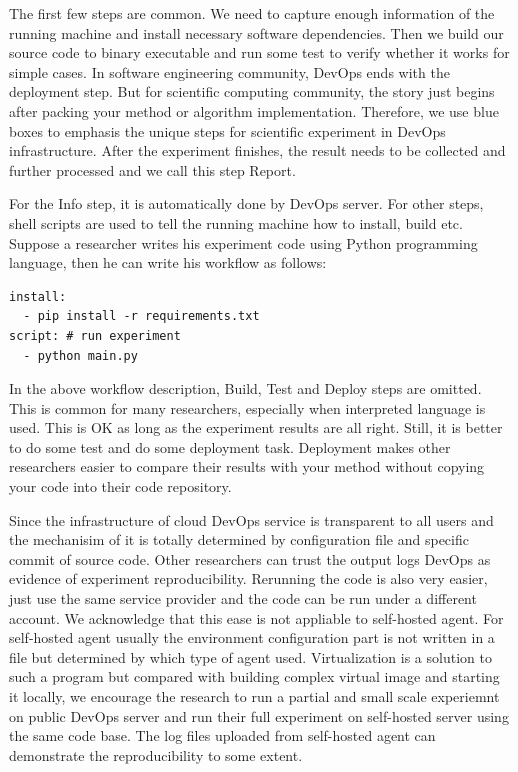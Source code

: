\documentclass{IEEEcsmag}
\begin{document}
The first few steps are common. We need to capture enough information of the running machine and install necessary software dependencies. Then we build our source code to binary executable and run some test to verify whether it works for simple cases. In software engineering community, DevOps ends with the deployment step. But for scientific computing community, the story just begins after packing your method or algorithm implementation. Therefore, we use blue boxes to emphasis the unique steps for scientific experiment in DevOps infrastructure. After the experiment finishes, the result needs to be collected and further processed and we call this step Report.

For the Info step, it is automatically done by DevOps server. For other steps, shell scripts are used to tell the running machine how to install, build etc. Suppose a researcher writes his experiment code using Python programming language, then he can write his workflow as follows:
\begin{lstlisting}[caption={workflow description}, label={lst:wd}]
install: 
  - pip install -r requirements.txt
script: # run experiment
  - python main.py
\end{lstlisting}

In the above workflow description, Build, Test and Deploy steps are omitted. This is common for many researchers, especially when interpreted language is used. This is OK as long as the experiment results are all right. Still, it is better to do some test and do some deployment task. Deployment makes other researchers easier to compare their results with your method without copying your code into their code repository.

Since the infrastructure of cloud DevOps service is transparent to all users and the mechanisim of it is totally determined by configuration file and specific commit of source code. Other researchers can trust the output logs DevOps as evidence of experiment reproducibility. Rerunning the code is also very easier, just use the same service provider and the code can be run under a different account. We acknowledge that this ease is not appliable to self-hosted agent. For self-hosted agent usually the environment configuration part is not written in a file but determined by which type of agent used. Virtualization is a solution to such a program but compared with building complex virtual image and starting it locally, we encourage the research to run a partial and small scale experiemnt on public DevOps server and run their full experiment on self-hosted server using the same code base. The log files uploaded from self-hosted agent can demonstrate the reproducibility to some extent.
\end{document}
